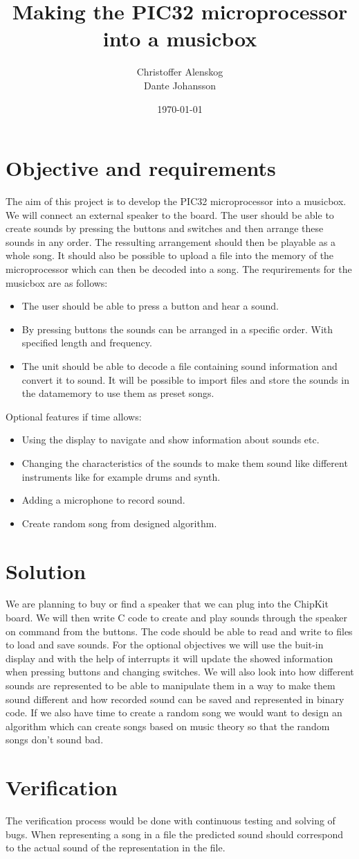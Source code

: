 \documentclass[a4paper]{article}
\title{Making the PIC32 microprocessor into a musicbox}
\author{Christoffer Alenskog \\ Dante Johansson}
\date{\today}
\begin{document}
\maketitle

\section{Objective and requirements}

The aim of this project is to develop the PIC32 microprocessor into a musicbox. We will connect an external speaker to the board. The user should be able to create sounds by pressing the buttons and switches and then arrange these sounds in any order. The ressulting arrangement should then be playable as a whole song. It should also be possible to upload a file into the memory of the microprocessor which can then be decoded into a song. The requrirements for the musicbox are as follows:
\begin{itemize}
	\item The user should be able to press a button and hear a sound.
	\item By pressing buttons the sounds can be arranged in a specific order. With specified length and frequency.
	\item The unit should be able to decode a file containing sound information and convert it to sound. It will be possible to import files and store the sounds in the datamemory to use them as preset songs.
\end{itemize}
Optional features if time allows:
\begin{itemize}
	\item Using the display to navigate and show information about sounds etc.
	\item Changing the characteristics of the sounds to make them sound like different instruments like for example drums and synth.
	\item Adding a microphone to record sound.
	\item Create random song from designed algorithm.
\end{itemize}

\section{Solution}

We are planning to buy or find a speaker that we can plug into the ChipKit board. We will then write C code to create and play sounds through the speaker on command from the buttons. The code should be able to read and write to files to load and save sounds. For the optional objectives we will use the buit-in display and with the help of interrupts it will update the showed information when pressing buttons and changing switches. We will also look into how different sounds are represented to be able to manipulate them in a way to make them sound different and how recorded sound can be saved and represented in binary code. If we also have time to create a random song we would want to design an algorithm which can create songs based on music theory so that the random songs don't sound bad.

\section{Verification}

The verification process would be done with continuous testing and solving of bugs. When representing a song in a file the predicted sound should correspond to the actual sound of the representation in the file.
\end{document}
